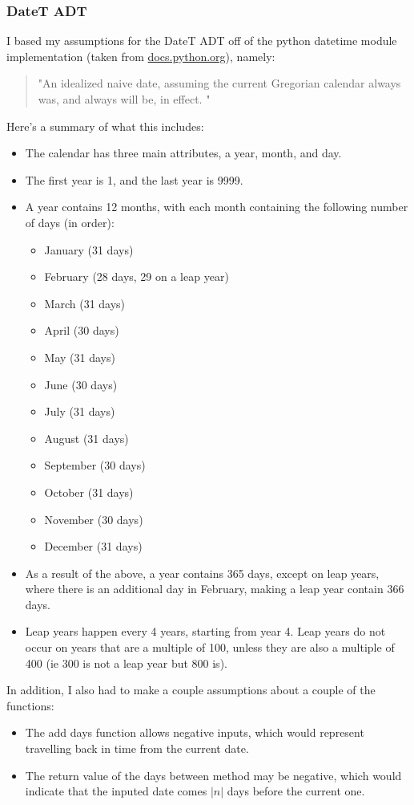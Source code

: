 \documentclass[12pt]{article}
\begin{document}
\subsubsection{DateT ADT}
I based my assumptions for the DateT ADT off of the python datetime module implementation (taken from \url{docs.python.org}), namely:
\begin{quotation}
  "An idealized naive date, assuming the current Gregorian calendar always was, and always will be, in effect. "
\end{quotation}
Here's a summary of what this includes:
\begin{itemize}
  \item The calendar has three main attributes, a year, month, and day.
  \item The first year is 1, and the last year is 9999.
  \item A year contains 12 months, with each month containing the following number of days (in order):
  \begin{itemize}
      \item January (31 days)
      \item February (28 days, 29 on a leap year)
      \item March (31 days)
      \item April (30 days)
      \item May (31 days)
      \item June (30 days)
      \item July (31 days)
      \item August (31 days)
      \item September (30 days)
      \item October (31 days)
      \item November (30 days)
      \item December (31 days)
  \end{itemize}
  \item As a result of the above, a year contains 365 days, except on leap years, where there is an additional day in February, making a leap year contain 366 days.
  \item Leap years happen every 4 years, starting from year 4. Leap years do not occur on years that are a multiple of 100, unless they are also a multiple of 400 (ie 300 is not a leap year but 800 is).
\end{itemize}

In addition, I also had to make a couple assumptions about a couple of the functions:
\begin{itemize}
  \item The add days function allows negative inputs, which would represent travelling back in time from the current date.
  \item The return value of the days between method may be negative, which would indicate that the inputed date comes $|n|$ days before the current one.
\end{itemize}
\end{document}

